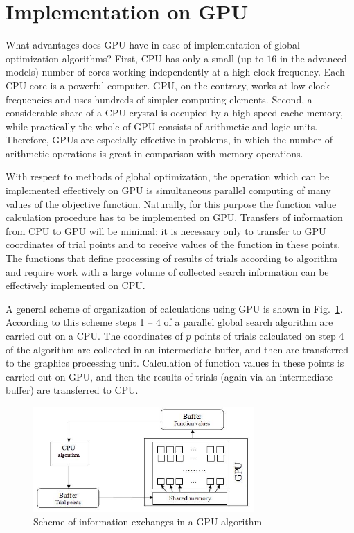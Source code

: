 \documentclass[smallcondensed]{svjour3}     %
\begin{document}
\section{Implementation on GPU} \label{sec:5}

What advantages does GPU have in case of implementation of global optimization algorithms? First, CPU has only a small (up to $16$ in the advanced models) number of cores working independently at a high clock frequency. Each CPU core is a powerful computer. GPU, on the contrary, works at low clock frequencies and uses hundreds of simpler computing elements. Second, a considerable share of a CPU crystal is occupied by a high-speed cache memory, while practically the whole of GPU consists of arithmetic and logic units. Therefore, GPUs are especially effective in problems, in which the number of arithmetic operations is great in comparison with memory operations.

With respect to methods of global optimization, the operation which can be implemented effectively on GPU is simultaneous parallel computing of many values of the objective function. Naturally, for this purpose the function value calculation procedure has to be implemented on GPU. Transfers of information from CPU to GPU will be minimal: it is necessary only to transfer to GPU coordinates of trial points and to receive values of the function in these points. The functions that define processing of results of trials according to algorithm and require work with a large volume of collected search information can be effectively implemented on CPU.

A general scheme of organization of calculations using GPU is shown in Fig.~\ref{fig:3}. According to this scheme steps 1 -- 4 of a parallel global search algorithm are carried out on a CPU. The coordinates of $p$ points of trials calculated on step 4 of the algorithm are collected in an intermediate buffer, and then are transferred to the graphics processing unit. Calculation of function values in these points is carried out on GPU, and then the results of trials (again via an intermediate buffer) are transferred to CPU.

\begin{figure}
	\center
  \includegraphics[width=0.75\textwidth]{fig3.jpg} 
  \caption{Scheme of information exchanges in a GPU algorithm}
  \label{fig:3}
\end{figure}
\end{document}
